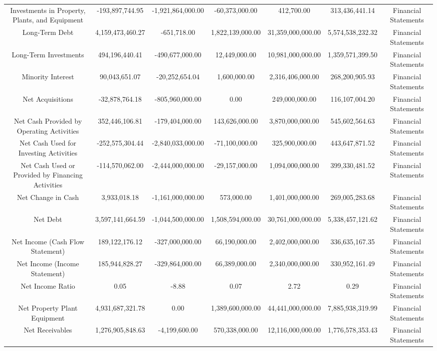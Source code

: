 \begin{longtable}{ccccccc}
Investments in Property, Plants, and Equipment & -193,897,744.95 & -1,921,864,000.00 & -60,373,000.00 & 412,700.00 & 313,436,441.14 & Financial Statements \\
Long-Term Debt & 4,159,473,460.27 & -651,718.00 & 1,822,139,000.00 & 31,359,000,000.00 & 5,574,538,232.32 & Financial Statements \\
Long-Term Investments & 494,196,440.41 & -490,677,000.00 & 12,449,000.00 & 10,981,000,000.00 & 1,359,571,399.50 & Financial Statements \\
Minority Interest & 90,043,651.07 & -20,252,654.04 & 1,600,000.00 & 2,316,406,000.00 & 268,200,905.93 & Financial Statements \\
Net Acquisitions & -32,878,764.18 & -805,960,000.00 & 0.00 & 249,000,000.00 & 116,107,004.20 & Financial Statements \\
Net Cash Provided by Operating Activities & 352,446,106.81 & -179,404,000.00 & 143,626,000.00 & 3,870,000,000.00 & 545,602,564.63 & Financial Statements \\
Net Cash Used for Investing Activities & -252,575,304.44 & -2,840,033,000.00 & -71,100,000.00 & 325,900,000.00 & 443,647,871.52 & Financial Statements \\
Net Cash Used or Provided by Financing Activities & -114,570,062.00 & -2,444,000,000.00 & -29,157,000.00 & 1,094,000,000.00 & 399,330,481.52 & Financial Statements \\
Net Change in Cash & 3,933,018.18 & -1,161,000,000.00 & 573,000.00 & 1,401,000,000.00 & 269,005,283.68 & Financial Statements \\
Net Debt & 3,597,141,664.59 & -1,044,500,000.00 & 1,508,594,000.00 & 30,761,000,000.00 & 5,338,457,121.62 & Financial Statements \\
Net Income (Cash Flow Statement) & 189,122,176.12 & -327,000,000.00 & 66,190,000.00 & 2,402,000,000.00 & 336,635,167.35 & Financial Statements \\
Net Income (Income Statement) & 185,944,828.27 & -329,864,000.00 & 66,389,000.00 & 2,340,000,000.00 & 330,952,161.49 & Financial Statements \\
Net Income Ratio & 0.05 & -8.88 & 0.07 & 2.72 & 0.29 & Financial Statements \\
Net Property Plant Equipment & 4,931,687,321.78 & 0.00 & 1,389,600,000.00 & 44,441,000,000.00 & 7,885,938,319.99 & Financial Statements \\
Net Receivables & 1,276,905,848.63 & -4,199,600.00 & 570,338,000.00 & 12,116,000,000.00 & 1,776,578,353.43 & Financial Statements \\

\end{longtable}
